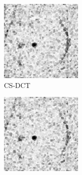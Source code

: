 \documentclass[journal]{IEEEtran}
\begin{document}
\begin{figure}[!h]
\begin{subfigure}[b]{0.24\linewidth}
        \includegraphics[width=\textwidth]{../images/potato/2D/weightsIm_cs_dct30.png}
        \caption{CS-DCT}
     \end{subfigure}
    \begin{subfigure}[b]{0.24\linewidth}
        \includegraphics[width=\textwidth]{../images/potato/2D/weightsIm_cs_wavelet30.png}

\end{subfigure}
\end{figure}
\end{document}
